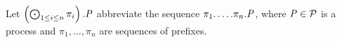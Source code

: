 Let $ \left( \bigodot_{1 \leq i \leq n} \pi_i \right).\mathit{P} $ abbreviate the sequence $ \pi_1.\ldots.\pi_n.\mathit{P} $, where $ \mathit{P} \in \mathcal{P} $ is a process and $ \pi_1, \ldots, \pi_n $ are sequences of prefixes.

